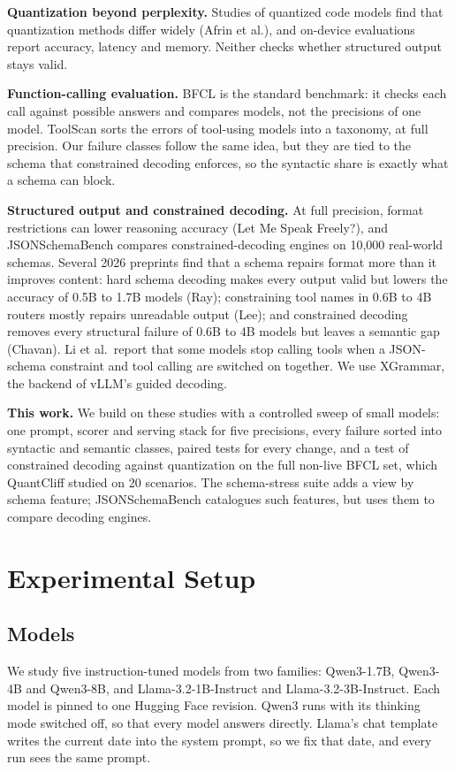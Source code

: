 \documentclass[conference]{IEEEtran}
\begin{document}
\textbf{Quantization beyond perplexity.} Studies of quantized code models find that quantization methods differ
widely (Afrin et al.), and on-device evaluations report accuracy, latency and memory. Neither checks whether
structured output stays valid.

\textbf{Function-calling evaluation.} BFCL is the standard benchmark: it checks each call against possible answers
and compares models, not the precisions of one model. ToolScan sorts the errors of tool-using models into a
taxonomy, at full precision. Our failure classes follow the same idea, but they are tied to the schema that
constrained decoding enforces, so the syntactic share is exactly what a schema can block.

\textbf{Structured output and constrained decoding.} At full precision, format restrictions can lower reasoning
accuracy (Let Me Speak Freely?), and JSONSchemaBench compares constrained-decoding engines on 10,000 real-world
schemas. Several 2026 preprints find that a schema repairs format more than it improves content: hard schema
decoding makes every output valid but lowers the accuracy of 0.5B to 1.7B models (Ray); constraining tool names in
0.6B to 4B routers mostly repairs unreadable output (Lee); and constrained decoding removes every structural failure
of 0.6B to 4B models but leaves a semantic gap (Chavan). Li et al.\ report that some models stop calling tools when
a JSON-schema constraint and tool calling are switched on together. We use XGrammar, the backend of vLLM's guided
decoding.

\textbf{This work.} We build on these studies with a controlled sweep of small models: one prompt, scorer and serving
stack for five precisions, every failure sorted into syntactic and semantic classes, paired tests for every change,
and a test of constrained decoding against quantization on the full non-live BFCL set, which QuantCliff studied on
20 scenarios. The schema-stress suite adds a view by schema feature; JSONSchemaBench catalogues such features, but
uses them to compare decoding engines.

\section{Experimental Setup}\label{sec:setup}

\subsection{Models}
We study five instruction-tuned models from two families: Qwen3-1.7B, Qwen3-4B and Qwen3-8B, and
Llama-3.2-1B-Instruct and Llama-3.2-3B-Instruct. Each model is pinned to one Hugging Face revision.
Qwen3 runs with its thinking mode switched off, so that every model answers directly. Llama's chat
template writes the current date into the system prompt, so we fix that date, and every run sees the
same prompt.
\end{document}
